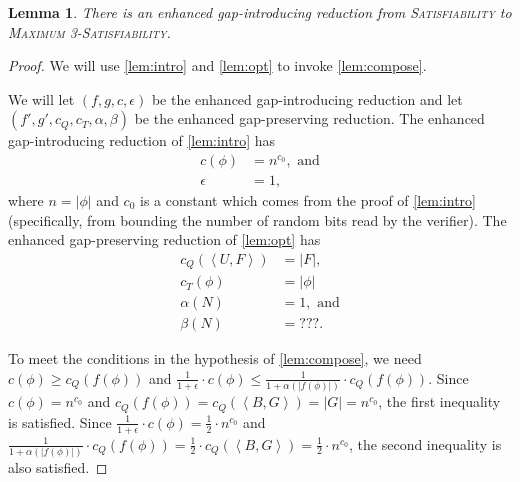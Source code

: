 \documentclass[]{article}
\theoremstyle{plain}
\newtheorem{lemma}{Lemma}
\theoremstyle{definition}
\newcommand{\pair}[2]{{\left\langle{#1}, {#2}\right\rangle}}
\begin{document}
\begin{lemma}\label{lem:gap3}
  There is an enhanced gap-introducing reduction from \textsc{Satisfiability} to \textsc{Maximum 3-Satisfiability}.
\end{lemma}
\begin{proof}
  We will use \autoref{lem:intro} and \autoref{lem:opt} to invoke \autoref{lem:compose}.

  We will let $(f, g, c, \epsilon)$ be the enhanced gap-introducing reduction and let $(f', g', c_Q, c_T, \alpha, \beta)$ be the enhanced gap-preserving reduction.
  The enhanced gap-introducing reduction of \autoref{lem:intro} has
  \begin{align*}
    c(\phi) & = n^{c_0}, \text{ and} \\
    \epsilon & = 1,
  \end{align*}
  where $n = |\phi|$ and $c_0$ is a constant which comes from the proof of \autoref{lem:intro} (specifically, from bounding the number of random bits read by the verifier).
  The enhanced gap-preserving reduction of \autoref{lem:opt} has
  \begin{align*}
    c_Q(\pair{U}{F}) & = |F|, \\
    c_T(\phi) & = |\phi| \\
    \alpha(N) & = 1, \text{ and} \\
    \beta(N) & = ???.
  \end{align*}

  To meet the conditions in the hypothesis of \autoref{lem:compose}, we need $c(\phi) \geq c_Q(f(\phi))$ and $\frac{1}{1 + \epsilon} \cdot c(\phi) \leq \frac{1}{1 + \alpha(|f(\phi)|)} \cdot c_Q(f(\phi))$.
  Since $c(\phi) = n^{c_0}$ and $c_Q(f(\phi)) = c_Q(\pair{B}{G}) = |G| = n^{c_0}$, the first inequality is satisfied.
  Since $\frac{1}{1 + \epsilon} \cdot c(\phi) = \frac{1}{2} \cdot n^{c_0}$ and $\frac{1}{1 + \alpha(|f(\phi)|)} \cdot c_Q(f(\phi)) = \frac{1}{2} \cdot c_Q(\pair{B}{G}) = \frac{1}{2} \cdot n^{c_0}$, the second inequality is also satisfied.


\end{proof}
\end{document}
